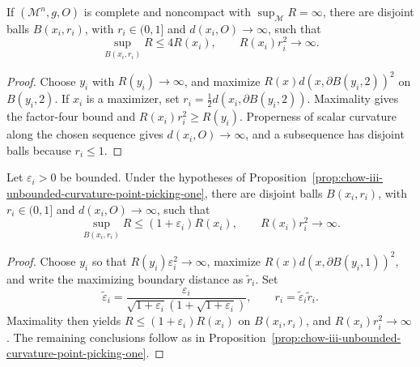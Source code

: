 \begin{proposition}
\label{prop:chow-iii-unbounded-curvature-point-picking-one}

If \((\mathcal M^n,g,O)\) is complete and noncompact with
\(\sup_{\mathcal M} R=\infty\), there are disjoint balls \(B(x_i,r_i)\), with
\(r_i\in(0,1]\) and \(d(x_i,O)\to\infty\), such that
\[
 \sup_{B(x_i,r_i)}R\le4R(x_i),\qquad R(x_i)r_i^2\to\infty.
\]
\end{proposition}
\begin{proof}
\sketch Choose \(y_i\) with \(R(y_i)\to\infty\), and maximize
\(R(x)d(x,\partial B(y_i,2))^2\) on \(B(y_i,2)\).  If \(x_i\) is a maximizer,
set \(r_i=\frac12d(x_i,\partial B(y_i,2))\).  Maximality gives the factor-four
bound and \(R(x_i)r_i^2\ge R(y_i)\).  Properness of scalar curvature along the
chosen sequence gives \(d(x_i,O)\to\infty\), and a subsequence has disjoint
balls because \(r_i\le1\).
\end{proof}

\begin{proposition}
\label{prop:chow-iii-unbounded-curvature-point-picking-two}

Let \(\varepsilon_i>0\) be bounded.  Under the hypotheses of
Proposition~\ref{prop:chow-iii-unbounded-curvature-point-picking-one}, there
are disjoint balls \(B(x_i,r_i)\), with \(r_i\in(0,1]\) and
\(d(x_i,O)\to\infty\), such that
\[
 \sup_{B(x_i,r_i)}R\le(1+\varepsilon_i)R(x_i),
 \qquad R(x_i)r_i^2\to\infty.
\]
\end{proposition}
\begin{proof}
\sketch Choose \(y_i\) so that \(R(y_i)\varepsilon_i^2\to\infty\), maximize
\(R(x)d(x,\partial B(y_i,1))^2\), and write the maximizing boundary distance
as \(\widetilde r_i\).  Set
\[
 \widetilde\varepsilon_i=
 \frac{\varepsilon_i}{\sqrt{1+\varepsilon_i}(1+\sqrt{1+\varepsilon_i})},
 \qquad r_i=\widetilde\varepsilon_i\widetilde r_i.
\]
Maximality then yields \(R\le(1+\varepsilon_i)R(x_i)\) on \(B(x_i,r_i)\),
and \(R(x_i)r_i^2\to\infty\).  The remaining conclusions follow as in
Proposition~\ref{prop:chow-iii-unbounded-curvature-point-picking-one}.
\end{proof}

